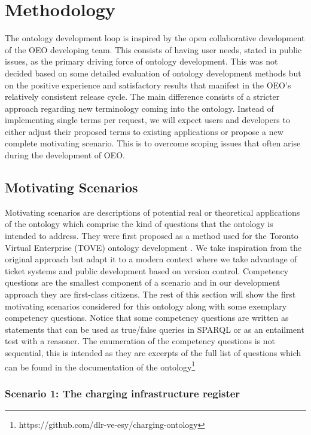 ﻿\section{Methodology}
\label{methodology}

The ontology development loop is inspired by the open collaborative development
of the OEO developing team. This consists of having user needs, stated in public
issues, as the primary driving force of ontology development. This was not
decided based on some detailed evaluation of ontology development methods but on
the positive experience and satisfactory results that manifest in the OEO's
relatively consistent release cycle. The main difference consists of a stricter
approach regarding new terminology coming into the ontology. Instead of
implementing single terms per request, we will expect users and developers to
either adjust their proposed terms to existing applications or propose a new
complete motivating scenario. This is to overcome scoping issues that often
arise during the development of OEO. 


\subsection{Motivating Scenarios}

Motivating scenarios are descriptions of potential real or theoretical
applications of the ontology which comprise the kind of questions that the
ontology is intended to address.  They were first proposed as a method used for
the Toronto Virtual Enterprise (TOVE) ontology development
\cite{Gruninger.1995}. We take inspiration from the original approach but adapt
it to a modern context where we take advantage of ticket systems and public
development based on version control. Competency questions are the smallest
component of a scenario and in our development approach they are first-class
citizens. The rest of this section will show the first motivating scenarios
considered for this ontology along with some exemplary competency questions.
Notice that some competency questions are written as statements that can be
used as true/false queries in SPARQL or as an entailment test with a reasoner.
The enumeration of the competency questions is not sequential, this is intended
as they are excerpts of the full list of questions which can be found in the
documentation of the ontology\footnote{https://github.com/dlr-ve-esy/charging-ontology}

\subsubsection*{Scenario 1: The charging infrastructure register}

